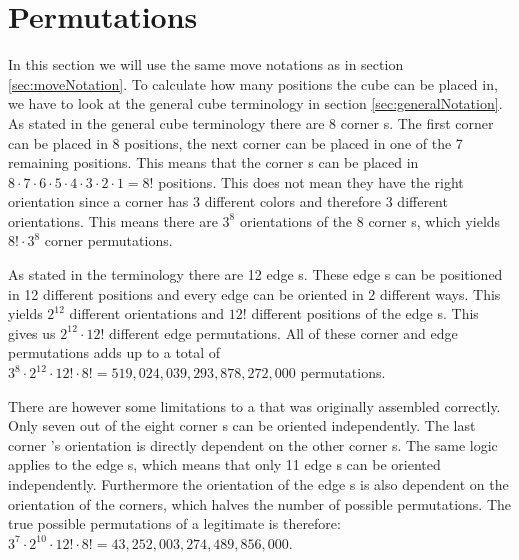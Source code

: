 \section{Permutations}
\label{sec:permutations}
In this section we will use the same move notations as in section \ref{sec:moveNotation}.
To calculate how many positions the cube can be placed in, we have to look at the general cube terminology in section \ref{sec:generalNotation}.
As stated in the general cube terminology there are 8 corner \cpiece{}s. The first corner \cpiece{} can be placed in 8 positions, the next corner \cpiece{} can be placed in one of the 7 remaining positions. %
This means that the corner \cpiece{}s can be placed in $8\cdot7\cdot6\cdot5\cdot4\cdot3\cdot2\cdot1=8!$ positions. 
This does not mean they have the right orientation since a corner \cpiece{} has 3 different colors and therefore 3 different orientations. This means there are $3^8$ orientations of the 8 corner \cpiece{}s, which yields $8!\cdot3^8$ corner permutations. 

As stated in the terminology there are 12 edge \cpiece{}s. These edge \cpiece{}s can be positioned in 12 different positions and every edge \cpiece{} can be oriented in 2 different ways. This yields $2^{12}$ different orientations and $12!$ different positions of the edge \cpiece{}s. This gives us $2^{12}\cdot12!$ different edge permutations. All of these corner and edge permutations adds up to a total of  $3^8\cdot2^{12}\cdot12!\cdot8!=519,024,039,293,878,272,000$ permutations.

There are however some limitations to a \rubik{} that was originally assembled correctly. 
Only seven out of the eight corner \cpiece{}s can be oriented independently. 
The last corner \cpiece{}'s orientation is directly dependent on the other corner \cpiece{}s. 
The same logic applies to the edge \cpiece{}s, which means that only 11 edge \cpiece{}s can be oriented independently.
Furthermore the orientation of the edge \cpiece{}s is also dependent on the orientation of the corners, which halves the number of possible permutations.
The true possible permutations of a legitimate \rubik{} is therefore:
$3^7\cdot2^{10}\cdot12!\cdot8!=43,252,003,274,489,856,000$.